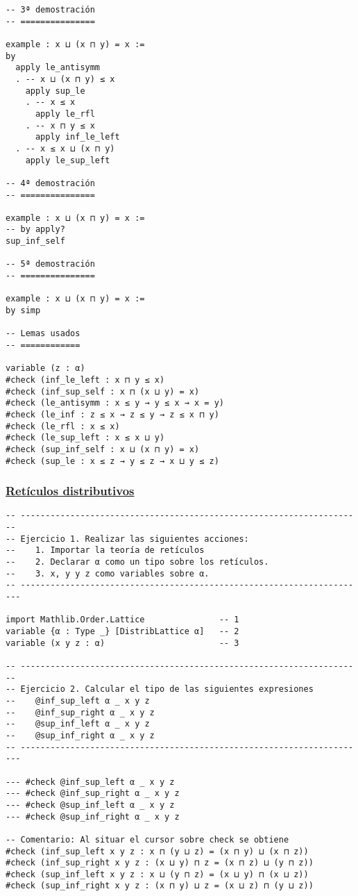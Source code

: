 \begin{verbatim}
-- 3ª demostración
-- ===============

example : x ⊔ (x ⊓ y) = x :=
by
  apply le_antisymm
  . -- x ⊔ (x ⊓ y) ≤ x
    apply sup_le
    . -- x ≤ x
      apply le_rfl
    . -- x ⊓ y ≤ x
      apply inf_le_left
  . -- x ≤ x ⊔ (x ⊓ y)
    apply le_sup_left

-- 4ª demostración
-- ===============

example : x ⊔ (x ⊓ y) = x :=
-- by apply?
sup_inf_self

-- 5ª demostración
-- ===============

example : x ⊔ (x ⊓ y) = x :=
by simp

-- Lemas usados
-- ============

variable (z : α)
#check (inf_le_left : x ⊓ y ≤ x)
#check (inf_sup_self : x ⊓ (x ⊔ y) = x)
#check (le_antisymm : x ≤ y → y ≤ x → x = y)
#check (le_inf : z ≤ x → z ≤ y → z ≤ x ⊓ y)
#check (le_rfl : x ≤ x)
#check (le_sup_left : x ≤ x ⊔ y)
#check (sup_inf_self : x ⊔ (x ⊓ y) = x)
#check (sup_le : x ≤ z → y ≤ z → x ⊔ y ≤ z)
\end{verbatim}

\subsubsection{\href{./src/Basicos/Reticulos\_distributivos.lean}{Retículos distributivos}}
\label{sec:org8b57ad0}
\begin{verbatim}
-- ---------------------------------------------------------------------
-- Ejercicio 1. Realizar las siguientes acciones:
--    1. Importar la teoría de retículos
--    2. Declarar α como un tipo sobre los retículos.
--    3. x, y y z como variables sobre α.
-- ----------------------------------------------------------------------

import Mathlib.Order.Lattice               -- 1
variable {α : Type _} [DistribLattice α]   -- 2
variable (x y z : α)                       -- 3

-- ---------------------------------------------------------------------
-- Ejercicio 2. Calcular el tipo de las siguientes expresiones
--    @inf_sup_left α _ x y z
--    @inf_sup_right α _ x y z
--    @sup_inf_left α _ x y z
--    @sup_inf_right α _ x y z
-- ----------------------------------------------------------------------

--- #check @inf_sup_left α _ x y z
--- #check @inf_sup_right α _ x y z
--- #check @sup_inf_left α _ x y z
--- #check @sup_inf_right α _ x y z

-- Comentario: Al situar el cursor sobre check se obtiene
#check (inf_sup_left x y z : x ⊓ (y ⊔ z) = (x ⊓ y) ⊔ (x ⊓ z))
#check (inf_sup_right x y z : (x ⊔ y) ⊓ z = (x ⊓ z) ⊔ (y ⊓ z))
#check (sup_inf_left x y z : x ⊔ (y ⊓ z) = (x ⊔ y) ⊓ (x ⊔ z))
#check (sup_inf_right x y z : (x ⊓ y) ⊔ z = (x ⊔ z) ⊓ (y ⊔ z))
\end{verbatim}


